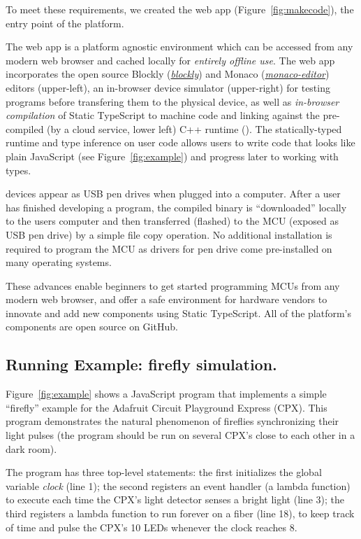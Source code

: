 To meet these requirements, we created the \MC web app (Figure~\ref{fig:makecode}), the entry point of the platform.

The \MC web app is a platform agnostic environment which can be accessed from any modern web browser and cached locally for \emph{entirely offline use}. The \MC web app incorporates the open source Blockly (\emph{\href{https://github.com/google/blockly}{blockly}}) and Monaco (\emph{\href{https://github.com/Microsoft/monaco-editor}{monaco-editor}}) editors (upper-left), an in-browser device simulator (upper-right) for testing programs before transfering them to the physical device, as well as \emph{in-browser compilation} of Static TypeScript to machine code and linking against the pre-compiled (by a cloud service, lower left) C++ runtime (\emph{\CON}). The statically-typed runtime and type inference on user code allows users to write code that looks like plain JavaScript (see Figure~\ref{fig:example}) and progress later to working with types.

\MC devices appear as USB pen drives when plugged into a computer. After a user has finished developing a program, the compiled binary is ``downloaded'' locally to the users computer and then transferred (flashed) to the MCU (exposed as USB pen drive) by a simple file copy operation. No additional installation is required to program the MCU as drivers for pen drive come pre-installed on many operating systems.

These advances enable beginners to get started programming MCUs from any modern web browser, and offer a safe environment for hardware vendors to innovate and add new components using Static TypeScript. All of the platform's components are open source on GitHub.

\subsection{Running Example: firefly simulation.}

Figure~\ref{fig:example} shows a JavaScript
program that implements a simple ``firefly'' example
for the Adafruit Circuit Playground Express (CPX).
This program demonstrates the natural phenomenon
of fireflies synchronizing their light pulses (the program should be
run on several CPX's close to each other in a dark room).

The program has three top-level statements:
the first initializes the global variable \emph{clock} (line 1); the
second registers an event handler (a lambda function) to execute
each time the CPX's light detector senses a bright light (line 3); the
third registers a lambda function to run forever on a fiber (line 18),
to keep track of time and pulse the CPX's 10 LEDs whenever the
clock reaches 8.

